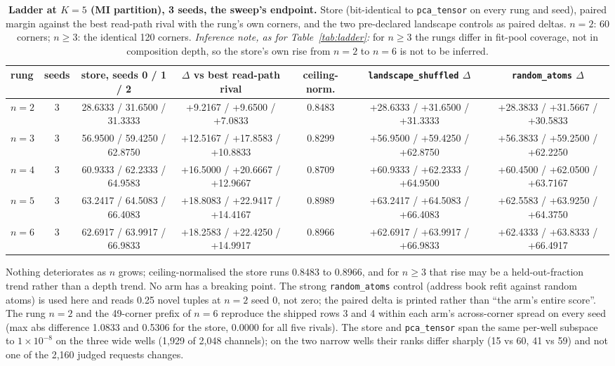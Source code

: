 \documentclass{article} %
\newcommand{\sci}[2]{\ensuremath{#1\times10^{#2}}}
\begin{document}
\begin{table}[h]
\centering\small
\caption{\textbf{Ladder at $K=5$ (MI partition), 3 seeds, the sweep's endpoint.} Store
(bit-identical to \texttt{pca\_tensor} on every rung and seed), paired margin against the best
read-path rival with the rung's own corners, and the two pre-declared landscape controls as paired deltas.
$n=2$: 60 corners; $n\ge3$: the identical 120 corners. \emph{Inference note, as for %
Table~\ref{tab:ladder}:} for $n\ge3$ the rungs differ in fit-pool coverage, not in composition
depth, so the store's own rise from $n=2$ to $n=6$ is not to be inferred.}
\label{tab:k5}
\setlength{\tabcolsep}{2.4pt}
\begin{adjustbox}{max width=\linewidth}\begin{tabular}{lcccccc}
\toprule
rung & seeds & store, seeds 0 / 1 / 2 & $\Delta$ vs best read-path rival & ceiling-norm. & \texttt{landscape\_shuffled} $\Delta$ & \texttt{random\_atoms} $\Delta$ \\
\midrule
$n=2$ & 3 & 28.6333 / 31.6500 / 31.3333 & +9.2167 / +9.6500 / +7.0833 & 0.8483 & +28.6333 / +31.6500 / +31.3333 & +28.3833 / +31.5667 / +30.5833 \\
$n=3$ & 3 & 56.9500 / 59.4250 / 62.8750 & +12.5167 / +17.8583 / +10.8833 & 0.8299 & +56.9500 / +59.4250 / +62.8750 & +56.3833 / +59.2500 / +62.2250 \\
$n=4$ & 3 & 60.9333 / 62.2333 / 64.9583 & +16.5000 / +20.6667 / +12.9667 & 0.8709 & +60.9333 / +62.2333 / +64.9500 & +60.4500 / +62.0500 / +63.7167 \\
$n=5$ & 3 & 63.2417 / 64.5083 / 66.4083 & +18.8083 / +22.9417 / +14.4167 & 0.8989 & +63.2417 / +64.5083 / +66.4083 & +62.5583 / +63.9250 / +64.3750 \\
$n=6$ & 3 & 62.6917 / 63.9917 / 66.9833 & +18.2583 / +22.4250 / +14.9917 & 0.8966 & +62.6917 / +63.9917 / +66.9833 & +62.4333 / +63.8333 / +66.4917 \\
\bottomrule
\end{tabular}\end{adjustbox}
\end{table}

\noindent Nothing deteriorates as $n$ grows; ceiling-normalised the store runs 0.8483 to 0.8966,
and for $n\ge3$ that rise may be a held-out-fraction trend rather than a depth trend. No arm has a
breaking point. The strong \texttt{random\_atoms} control (address book refit against random
atoms) is used here and reads 0.25 novel tuples at $n=2$ seed 0, not zero; the paired delta is
printed rather than ``the arm's entire score''. %
The rung $n=2$ and the 49-corner prefix of $n=6$ reproduce the shipped rows 3 and 4 within each
arm's across-corner spread on every seed (max abs difference 1.0833 and 0.5306 for the store, 0.0000
for all five rivals). %
The store and \texttt{pca\_tensor} span the same per-well subspace to \sci{1}{-8} on the three wide
wells (1,929 of 2,048 channels); on the two narrow wells their ranks differ sharply (15 vs 60, 41 vs
59) and not one of the 2,160 judged requests changes. %
\end{document}
